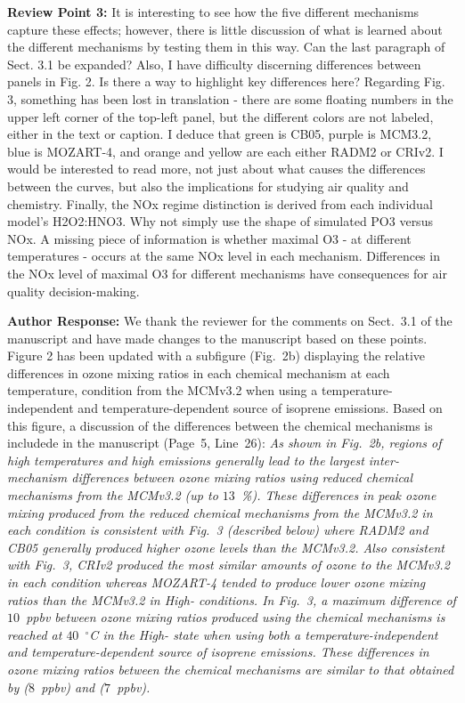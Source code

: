 \documentclass{article}
\DeclareRobustCommand*\degree{\ensuremath{^{\circ}}}
\begin{document}
\textbf{Review Point 3:} It is interesting to see how the five different mechanisms capture these effects; however, there is little discussion of what is learned about the different mechanisms by testing them in this way. Can the last paragraph of Sect. 3.1 be expanded? Also, I have difficulty discerning differences between panels in Fig. 2. Is there a way to highlight key differences here? Regarding Fig. 3, something has been lost in translation - there are some floating numbers in the upper left corner of the top-left panel, but the different colors are not labeled, either in the text or caption. I deduce that green is CB05, purple is MCM3.2, blue is MOZART-4, and orange and yellow are each either RADM2 or CRIv2. I would be interested to read more, not just about what causes the differences between the curves, but also the implications for studying air quality and chemistry. Finally, the NOx regime distinction is derived from each individual model's H2O2:HNO3. Why not simply use the shape of simulated PO3 versus NOx. A missing piece of information is whether maximal O3 - at different temperatures - occurs at the same NOx level in each mechanism. Differences in the NOx level of maximal O3 for different mechanisms have consequences for air quality decision-making.

\textbf{Author Response:} We thank the reviewer for the comments on Sect.~3.1 of the manuscript and have made changes to the manuscript based on these points.
Figure 2 has been updated with a subfigure (Fig.~2b) displaying the relative differences in ozone mixing ratios in each chemical mechanism at each temperature,  condition from the MCMv3.2 when using a temperature-independent and temperature-dependent source of isoprene emissions. Based on this figure, a discussion of the differences between the chemical mechanisms is includede in the manuscript (Page~5, Line~26):
\textit{
As shown in Fig.~2b, regions of high temperatures and high  emissions generally lead to the largest inter-mechanism differences between ozone mixing ratios using reduced chemical mechanisms from the MCMv3.2 (up to $13$~\%).
These differences in peak ozone mixing produced from the reduced chemical mechanisms from the MCMv3.2 in each  condition is consistent with Fig.~3 (described below) where RADM2 and CB05 generally produced higher ozone levels than the MCMv3.2.
Also consistent with Fig.~3, CRIv2 produced the most similar amounts of ozone to the MCMv3.2 in each  condition whereas MOZART-4 tended to produce lower ozone mixing ratios than the MCMv3.2 in High- conditions.
In Fig.~3, a maximum difference of $10$~ppbv between ozone mixing ratios produced using the chemical mechanisms is reached at $40$~\degree C in the High- state when using both a temperature-independent and temperature-dependent source of isoprene emissions.
These differences in ozone mixing ratios between the chemical mechanisms are similar to that obtained by \citet{Coates:2015} ($8$~ppbv) and \citet{vonSchneidemesser:2016} ($7$~ppbv).
}
\end{document}
